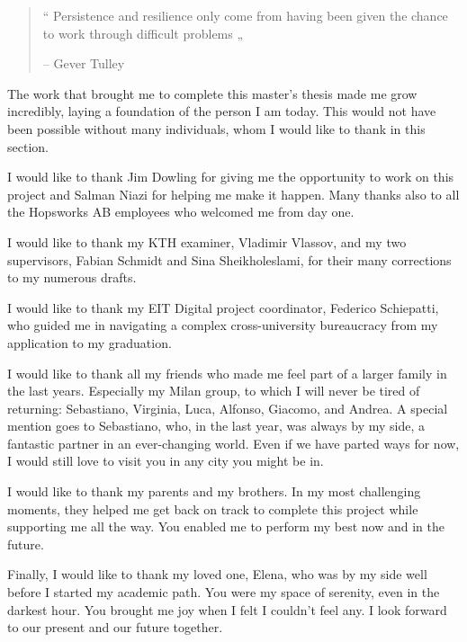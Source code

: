 
\begin{quote}
    “ Persistence and resilience only come from having been given the chance to work through difficult problems „

    -- Gever Tulley
\end{quote}
The work that brought me to complete this master's thesis made me grow incredibly, laying a foundation of the person I am today. This would not have been possible without many individuals, whom I would like to thank in this section.

I would like to thank Jim Dowling for giving me the opportunity to work on this project and Salman Niazi for helping me make it happen. Many thanks also to all the Hopsworks AB employees who welcomed me from day one.

I would like to thank my KTH examiner, Vladimir Vlassov, and my two supervisors, Fabian Schmidt and Sina Sheikholeslami, for their many corrections to my numerous drafts.

I would like to thank my EIT Digital project coordinator, Federico Schiepatti, who guided me in navigating a complex cross-university bureaucracy from my application to my graduation.

I would like to thank all my friends who made me feel part of a larger family in the last years. Especially my Milan group, to which I will never be tired of returning: Sebastiano, Virginia, Luca, Alfonso, Giacomo, and Andrea. A special mention goes to Sebastiano, who, in the last year, was always by my side, a fantastic partner in an ever-changing world. Even if we have parted ways for now, I would still love to visit you in any city you might be in.

I would like to thank my parents and my brothers. In my most challenging moments, they helped me get back on track to complete this project while supporting me all the way. You enabled me to perform my best now and in the future.

Finally, I would like to thank my loved one, Elena, who was by my side well before I started my academic path. You were my space of serenity, even in the darkest hour. You brought me joy when I felt I couldn't feel any. I look forward to our present and our future together.
